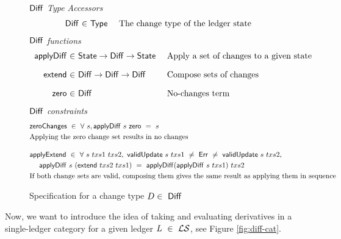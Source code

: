 \begin{figure*}[htb]
  \emph{$\mathsf{Diff}$ Type Accessors}
  \begin{equation*}
    \begin{array}{r@{~\in~}l@{~~~~}lr}
      \Diff
      & \Type
      & \text{The change type of the ledger state}
    \end{array}
  \end{equation*}
  \emph{$\mathsf{Diff}$ functions}
  \begin{equation*}
    \begin{array}{r@{~\in~}l@{~~~~}lr}
      \fun{applyDiff} & \type{State} \to \Diff \to \type{State} &
      \text{Apply a set of changes to a given state}
      \nextdef
      \fun{extend} & \Diff \to \Diff \to \Diff &
      \text{Compose sets of changes}
      \nextdef
      \fun{zero} & \Diff  &
      \text{No-changes term}
    \end{array}
  \end{equation*}
  \emph{$\mathsf{Diff}$ constraints}
  \begin{align*}
      & \fun{zeroChanges} ~\in~\forall~s, \fun{applyDiff}~s~\fun{zero}~=~s  \\
      & \text{Applying the zero change set results in no changes}
      \nextdef
      &\fun{applyExtend} ~\in~ \forall~s~txs1~txs2,~\fun{validUpdate}~s~txs1~\neq~\Err~\neq~\fun{validUpdate}~s~txs2, \\
      &~~~~\fun{applyDiff}~s~ (\fun{extend}~txs2~txs1)~=~\fun{applyDiff} (\fun{applyDiff}~s~txs1)~txs2 \\
      & \text{If both change sets are valid, composing them gives the same result as applying them in sequence}
  \end{align*}
  \caption{Specification for a change type $D \in~\mathsf{Diff}$}
  \label{fig:diff}
\end{figure*}

Now, we want to introduce the idea of taking and evaluating derivatives in
a single-ledger category for a given ledger $L~\in~\mathcal{L}\mathcal{S}$, see Figure \ref{fig:diff-cat}.


